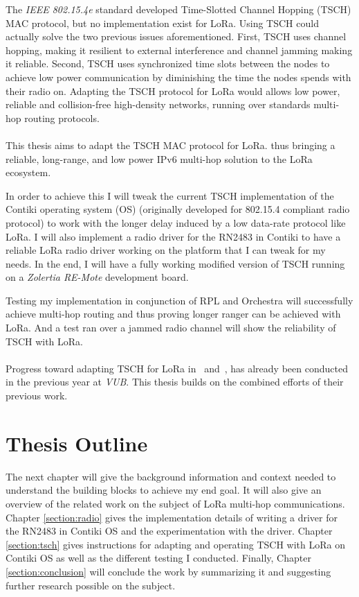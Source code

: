 The \emph{IEEE 802.15.4e} standard developed Time-Slotted Channel Hopping
(TSCH) MAC protocol, but no implementation exist for LoRa.
Using TSCH could actually solve the two previous issues aforementioned.
First, TSCH uses channel hopping, making it resilient to external interference and
channel jamming making it reliable.
Second, TSCH uses synchronized time slots between the nodes to achieve low
power communication by diminishing the time the nodes spends with their radio
on.
Adapting the TSCH protocol for LoRa would allows low power, 
reliable and collision-free high-density networks, running over standards
multi-hop routing protocols.

\paragraph{}

This thesis aims to adapt the TSCH MAC protocol for LoRa.
thus bringing a reliable, long-range, and low power IPv6 multi-hop
solution to the LoRa ecosystem.

In order to achieve this I will tweak the current TSCH implementation of
the Contiki operating system (OS) (originally developed for 802.15.4 compliant radio protocol)
to work with the longer delay induced by a low data-rate protocol like LoRa.
I will also implement a radio driver for the RN2483 in Contiki to have a
reliable LoRa radio driver working on the platform that I can tweak for my
needs.
In the end, I will have a fully working modified version of TSCH running on a 
\emph{Zolertia RE-Mote} development board.

Testing my implementation in conjunction of RPL and Orchestra will successfully
achieve multi-hop routing and thus proving longer ranger can be achieved with
LoRa.
And a test ran over a jammed radio channel will show the reliability of 
TSCH with LoRa.

\paragraph{}

Progress toward adapting TSCH for LoRa in~\cite{8847137} and~\cite{njomgang_2018}, 
has already been conducted in the previous year at \emph{VUB}.
This thesis builds on the combined efforts of their previous work.

\section{Thesis Outline}

The next chapter will give the background information and context needed to
understand the building blocks to achieve my end goal.
It will also give an overview of the related work on the subject of
LoRa multi-hop communications.
Chapter \ref{section:radio} gives the implementation details of writing a driver for the
RN2483 in Contiki OS and the experimentation with the driver.
Chapter \ref{section:tsch} gives instructions for adapting and operating TSCH with LoRa on
Contiki OS as well as the different testing I conducted.
Finally, Chapter \ref{section:conclusion} will conclude the work by summarizing it and suggesting
further research possible on the subject.
